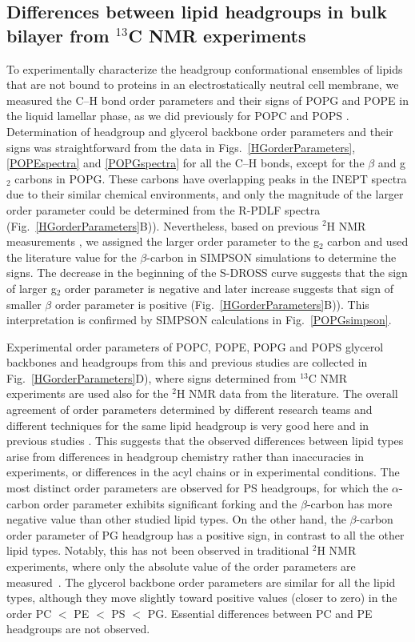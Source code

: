\documentclass[aps,prl,superscriptaddress,twocolumn]{revtex4}
\begin{document}
\subsection{Differences between lipid headgroups in bulk bilayer from $^{13}$C NMR experiments}

To experimentally characterize the headgroup conformational ensembles of lipids that are not
bound to proteins in an electrostatically neutral cell membrane, we measured the C--H bond order parameters
and their signs of POPG and POPE in the liquid lamellar phase, as we did previously for POPC and POPS \cite{ferreira13,ferreira16,antila19}.
Determination of headgroup and glycerol backbone order parameters and their signs
was straightforward from the data in Figs.~\ref{HGorderParameters}, \ref{POPEspectra} and \ref{POPGspectra}
for all the C--H bonds, except for the $\beta$ and g$_2$ carbons in POPG.
These carbons have overlapping peaks in the INEPT spectra due to their similar chemical environments,
and only the magnitude of the larger order parameter could be determined from the R-PDLF spectra (Fig.~\ref{HGorderParameters}B)).
Nevertheless, based on previous $^2$H NMR measurements \cite{wohlgemuth80,gally81,borle85},
we assigned the larger order parameter to the g$_2$ carbon
and used the literature value for the $\beta$-carbon in SIMPSON simulations to determine the signs.
The decrease in the beginning of the S-DROSS curve suggests that the sign of larger g$_2$ order parameter
is negative and later increase suggests that sign of smaller $\beta$ order parameter is positive (Fig.~\ref{HGorderParameters}B)).
This interpretation is confirmed by SIMPSON calculations in Fig.~\ref{POPGsimpson}.

Experimental order parameters of POPC, POPE, POPG and POPS glycerol backbones and headgroups from this and previous studies are collected in Fig.~\ref{HGorderParameters}D), where signs determined from $^{13}$C NMR experiments are used also for the $^2$H NMR data from the literature. The overall agreement of order parameters determined by different research teams and different techniques for the same lipid headgroup is very good here and in previous studies \cite{botan15,ollila16,antila19}. This suggests that the observed differences between lipid types arise from differences in headgroup chemistry rather than inaccuracies in experiments, or differences in the acyl chains or in experimental conditions. The most distinct order parameters are observed for PS headgroups, for which the $\alpha$-carbon order parameter exhibits significant forking and the $\beta$-carbon has more negative value than other studied lipid types. On the other hand, the $\beta$-carbon order parameter of PG headgroup has a positive sign, in contrast to all the other lipid types. Notably, this has not been observed in traditional $^2$H NMR experiments, where only the absolute value of the order parameters are measured~\cite{wohlgemuth80,gally81,borle85}. The glycerol backbone order parameters are similar for all the lipid types, although they move slightly toward positive values (closer to zero) in the order PC $<$ PE $<$ PS $<$ PG. Essential differences between PC and PE headgroups are not observed.
\end{document}
